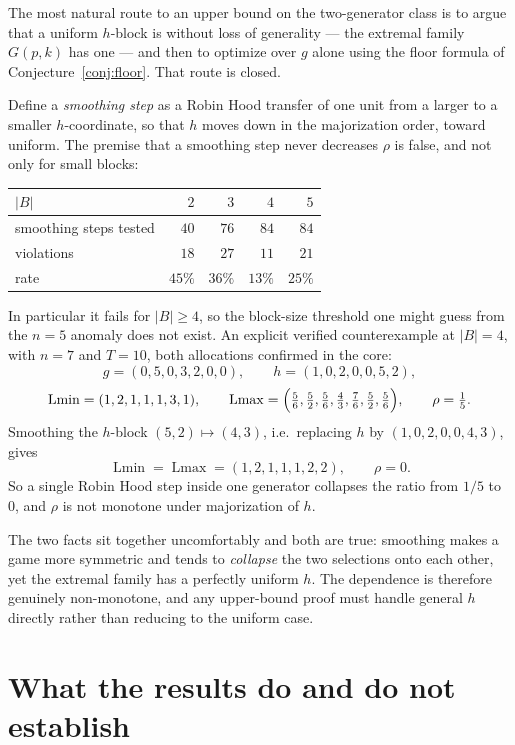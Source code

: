 \documentclass[11pt]{article}
\newcommand{\Lmin}{\operatorname{Lmin}}
\newcommand{\Lmax}{\operatorname{Lmax}}
\begin{document}
The most natural route to an upper bound on the two-generator class is to
argue that a uniform $h$-block is without loss of generality --- the extremal
family $G(p,k)$ has one --- and then to optimize over $g$ alone using the
floor formula of Conjecture~\ref{conj:floor}.  That route is closed.

Define a \emph{smoothing step} as a Robin Hood transfer of one unit from a
larger to a smaller $h$-coordinate, so that $h$ moves down in the
majorization order, toward uniform.  The premise that a smoothing step never
decreases $\rho$ is false, and not only for small blocks:
\begin{center}
\begin{tabular}{@{}lrrrr@{}}
\toprule
$|B|$ & $2$ & $3$ & $4$ & $5$\\
\midrule
smoothing steps tested & $40$ & $76$ & $84$ & $84$\\
violations & $18$ & $27$ & $11$ & $21$\\
rate & $45\%$ & $36\%$ & $13\%$ & $25\%$\\
\bottomrule
\end{tabular}
\end{center}
In particular it fails for $|B|\ge4$, so the block-size threshold one might
guess from the $n=5$ anomaly does not exist.  An explicit verified
counterexample at $|B|=4$, with $n=7$ and $T=10$, both allocations confirmed
in the core:
\[
 g=(0,5,0,3,2,0,0),\qquad h=(1,0,2,0,0,5,2),
\]
\[
 \Lmin=(1,2,1,1,1,3,1),\qquad
 \Lmax=\Bigl(\tfrac56,\tfrac52,\tfrac56,\tfrac43,\tfrac76,\tfrac52,\tfrac56\Bigr),
 \qquad \rho=\tfrac15 .
\]
Smoothing the $h$-block $(5,2)\mapsto(4,3)$, i.e.\ replacing $h$ by
$(1,0,2,0,0,4,3)$, gives
\[
 \Lmin=\Lmax=(1,2,1,1,1,2,2),\qquad \rho=0 .
\]
So a single Robin Hood step inside one generator collapses the ratio from
$1/5$ to $0$, and $\rho$ is not monotone under majorization of $h$.

The two facts sit together uncomfortably and both are true: smoothing makes a
game more symmetric and tends to \emph{collapse} the two selections onto each
other, yet the extremal family has a perfectly uniform $h$.  The dependence
is therefore genuinely non-monotone, and any upper-bound proof must handle
general $h$ directly rather than reducing to the uniform case.

\section{What the results do and do not establish}\label{sec:scope}
\end{document}

